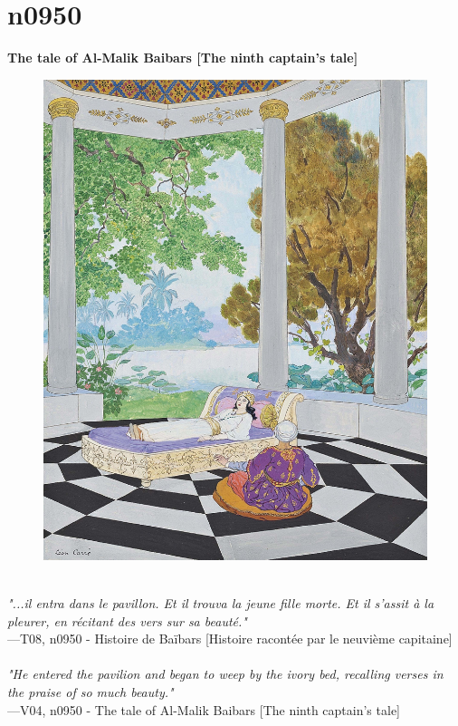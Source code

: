 \documentclass[../Carre_nights.tex]{subfiles}
\begin{document}
\newpage

\section{n0950}
\textbf{\Large{The tale of Al-Malik Baibars [The ninth captain’s tale]}} \\

\begin{figure}[ht]
\centering
\includegraphics[height=\figsize]{illustrations/volume_8/T08, n0950 - Histoire de Baïbars [Histoire racontée par le neuvième capitaine].jpg}
\end{figure}

\textit{\\
"...il entra dans le pavillon. Et il trouva la jeune fille morte. Et il s’assit à la pleurer, en récitant des vers sur sa beauté."} \\
—T08, n0950 - Histoire de Baïbars [Histoire racontée par le neuvième capitaine] \\~\\
\textit{"He entered the pavilion and began to weep by the ivory bed, recalling verses in the praise of so much beauty."} \\
—V04, n0950 - The tale of Al-Malik Baibars [The ninth captain’s tale]
\end{document}
